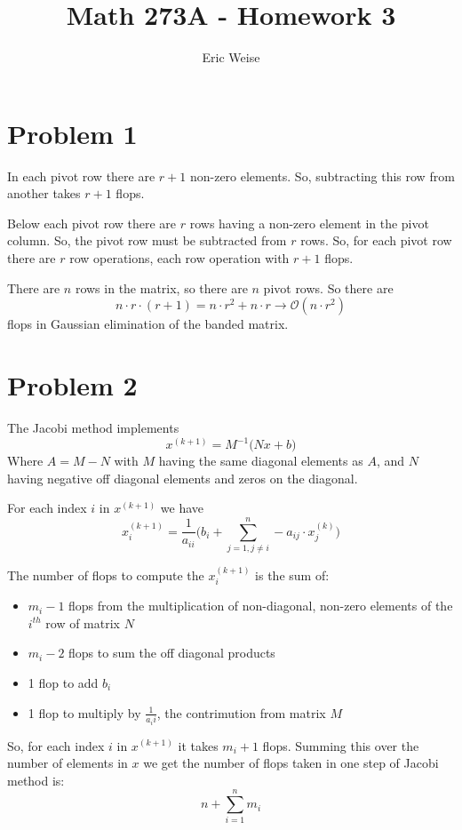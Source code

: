 \documentclass{article}
\title{Math 273A - Homework 3}
\author{Eric Weise}
\begin{document}
\maketitle

\section*{Problem 1}
In each pivot row there are $r+1$ non-zero elements.
So, subtracting this row from another takes $r+1$ flops.

Below each pivot row there are $r$ rows having a non-zero element in the pivot column. So, the pivot row must be subtracted from $r$ rows.
So, for each pivot row there are $r$ row operations, each row operation with $r+1$ flops.

There are $n$ rows in the matrix, so there are $n$ pivot rows.
So there are 
\[n \cdot r \cdot (r+1) = n\cdot r^2 + n \cdot r \to \mathcal{O}(n \cdot r^2) \]
flops in Gaussian elimination of the banded matrix.

\section*{Problem 2}
The Jacobi method implements 
\[ x^{(k+1)} = M^{-1}\big(Nx + b\big) \]
Where \(A = M-N\) with $M$ having the same diagonal elements as $A$, and $N$ having negative off diagonal elements and zeros on the diagonal.

For each index $i$ in $x^{(k+1)}$ we have 
\[ x^{(k+1)}_i = \frac{1}{a_{ii}} \Big( b_i + \sum_{j=1, j \neq i}^{n} -a_{ij} \cdot x^{(k)}_j \Big) \]

The number of flops to compute the $x_i^{(k+1)}$ is the sum of:
\begin{itemize}
    \item \(m_i - 1\) flops from the multiplication of non-diagonal, non-zero elements of the $i^{th}$ row of matrix $N$
    \item $m_i - 2$ flops to sum the off diagonal products
    \item 1 flop to add $b_i$
    \item 1 flop to multiply by $\frac{1}{a_ii}$, the contrimution from matrix $M$
\end{itemize}

So, for each index $i$ in $x^{(k+1)}$ it takes $m_i+1$ flops. Summing this over the number of elements in $x$ we get the number of flops taken in one step of Jacobi method is:
\[n + \sum_{i=1}^{n}m_i\]
\end{document}
